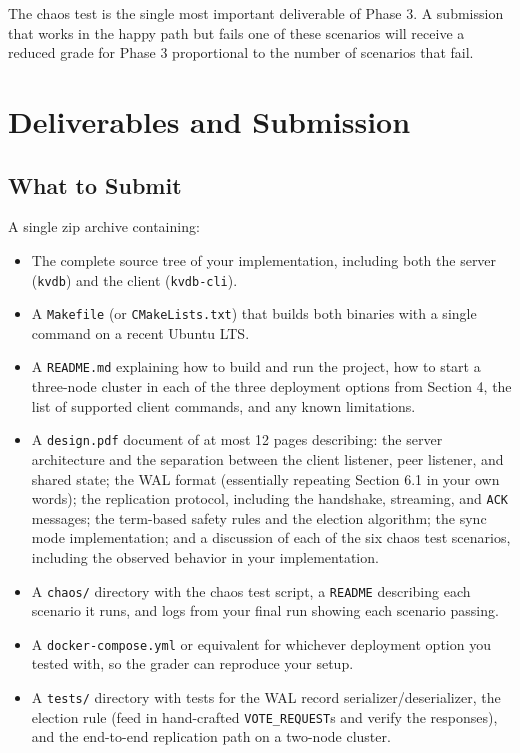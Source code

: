 \documentclass[11pt,a4paper]{article}
\begin{document}
The chaos test is the single most important deliverable of Phase 3. A submission that works in the happy path but fails one of these scenarios will receive a reduced grade for Phase 3 proportional to the number of scenarios that fail.

\section{Deliverables and Submission}

\subsection{What to Submit}
A single zip archive containing:

\begin{itemize}
\item The complete source tree of your implementation, including both the server (\texttt{kvdb}) and the client (\texttt{kvdb-cli}).
\item A \texttt{Makefile} (or \texttt{CMakeLists.txt}) that builds both binaries with a single command on a recent Ubuntu LTS.
\item A \texttt{README.md} explaining how to build and run the project, how to start a three-node cluster in each of the three deployment options from Section 4, the list of supported client commands, and any known limitations.
\item A \texttt{design.pdf} document of at most 12 pages describing: the server architecture and the separation between the client listener, peer listener, and shared state; the WAL format (essentially repeating Section 6.1 in your own words); the replication protocol, including the handshake, streaming, and \texttt{ACK} messages; the term-based safety rules and the election algorithm; the sync mode implementation; and a discussion of each of the six chaos test scenarios, including the observed behavior in your implementation.
\item A \texttt{chaos/} directory with the chaos test script, a \texttt{README} describing each scenario it runs, and logs from your final run showing each scenario passing.
\item A \texttt{docker-compose.yml} or equivalent for whichever deployment option you tested with, so the grader can reproduce your setup.
\item A \texttt{tests/} directory with tests for the WAL record serializer/deserializer, the election rule (feed in hand-crafted \texttt{VOTE\_REQUEST}s and verify the responses), and the end-to-end replication path on a two-node cluster.
\end{itemize}
\end{document}
